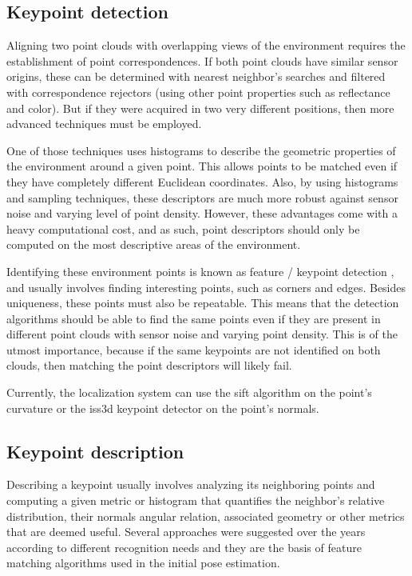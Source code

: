 \subsection{Keypoint detection}

Aligning two point clouds with overlapping views of the environment requires the establishment of point correspondences. If both point clouds have similar sensor origins, these can be determined with nearest neighbor's searches and filtered with correspondence rejectors (using other point properties such as reflectance and color). But if they were acquired in two very different positions, then more advanced techniques must be employed.

One of those techniques uses histograms to describe the geometric properties of the environment around a given point. This allows points to be matched even if they have completely different Euclidean coordinates. Also, by using histograms and sampling techniques, these descriptors are much more robust against sensor noise and varying level of point density. However, these advantages come with a heavy computational cost, and as such, point descriptors should only be computed on the most descriptive areas of the environment.

Identifying these environment points is known as feature / keypoint detection \cite{Filipe2014}, and usually involves finding interesting points, such as corners and edges. Besides uniqueness, these points must also be repeatable. This means that the detection algorithms should be able to find the same points even if they are present in different point clouds with sensor noise and varying point density. This is of the utmost importance, because if the same keypoints are not identified on both clouds, then matching the point descriptors will likely fail.

Currently, the localization system can use the \gls{sift} \cite{Lowe2004} algorithm on the point's curvature or the \gls{iss3d} \cite{Zhong2009} keypoint detector on the point's normals.


\subsection{Keypoint description}

Describing a keypoint usually involves analyzing its neighboring points and computing a given metric or histogram that quantifies the neighbor's relative distribution, their normals angular relation, associated geometry or other metrics that are deemed useful. Several approaches were suggested over the years according to different recognition needs and they are the basis of feature matching algorithms used in the initial pose estimation.

